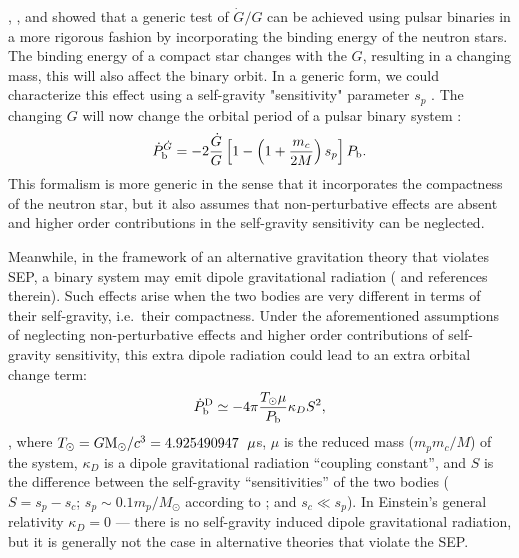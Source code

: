 \citet{nor90}, \citet{lwj+09}, and \citet{fwe+12} showed that a generic test
of $\dot{G}/G$ can be achieved using pulsar
binaries in a more rigorous fashion by incorporating the binding energy of the neutron stars.
The binding energy of a compact star changes with the $G$, resulting in a changing mass, this will also affect the binary orbit.
In a generic form, we could characterize this effect using a self-gravity "sensitivity" parameter $s_p$ \citep{Will93}.
The changing $G$ will now change the orbital period of a pulsar binary system \citep{nor90, lwj+09}:
\begin{equation}
\dot{P}_{\rm b}^{\dot{G}} = -2 \frac{\dot{G}}{G}
\left[1-\left( 1+\frac{m_c}{2M}\right) s_p\right]P_{\rm b}.
\end{equation}
This formalism is more generic in the sense that it incorporates the compactness of the neutron star, 
but it also assumes that non-perturbative effects are absent 
and higher order contributions in the self-gravity sensitivity can be neglected.

Meanwhile, in the framework of an alternative gravitation theory that violates
SEP, a binary system may emit dipole gravitational radiation (\citealt{Will93, Will01, lwj+09, fwe+12} and references
therein). Such effects arise when the two bodies are very different in terms
of their self-gravity, i.e.~their compactness.
Under the aforementioned assumptions of neglecting non-perturbative effects and higher order contributions of self-gravity sensitivity,
this extra dipole radiation could lead to an extra orbital change term:
\begin{equation}
\dot{P}_{\rm b}^{\rm D} \simeq -4\pi\frac{T_{\odot}\mu}{P_{\rm b}}\kappa_D S^2,
\end{equation}
\citep{Will93,lwj+09}, where $T_{\odot}=G{\rm M_{\odot}}/c^3=4.925490947$~${\rm
\mu}$s, $\mu$ is the reduced mass ($m_pm_c/M$) of the system,
$\kappa_D$ is a dipole
gravitational radiation ``coupling constant'', and $S$ is the difference
between the self-gravity ``sensitivities'' of the two bodies ($S = s_p - s_c$;
$s_p\sim0.1m_p/M_{\odot}$ according to \citealt{de92} ; and $s_c\ll s_p$).
In Einstein's general relativity $\kappa_D=0$ --- there is no self-gravity induced
dipole gravitational radiation, but it is generally not the case in alternative
theories that violate the SEP.

